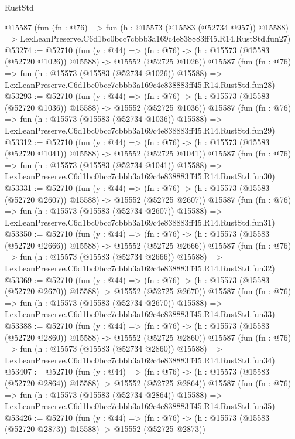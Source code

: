 \begin{lexlean}{RustStd}
\begin{coremodule}
    @15587
    (fun (fn : @76) =>
    fun (h : @15573 (@15583 (@52734 @957)) @15588) =>
    LexLeanPreserve.C6d1bc0bcc7cbbb3a169c4e838883ff45.R14.RustStd.fun27)
@53274 := @52710
    (fun (y : @44) =>
    (fn : @76) -> (h : @15573 (@15583 (@52720 @1026)) @15588) -> @15552 (@52725 @1026))
    @15587
    (fun (fn : @76) =>
    fun (h : @15573 (@15583 (@52734 @1026)) @15588) =>
    LexLeanPreserve.C6d1bc0bcc7cbbb3a169c4e838883ff45.R14.RustStd.fun28)
@53293 := @52710
    (fun (y : @44) =>
    (fn : @76) -> (h : @15573 (@15583 (@52720 @1036)) @15588) -> @15552 (@52725 @1036))
    @15587
    (fun (fn : @76) =>
    fun (h : @15573 (@15583 (@52734 @1036)) @15588) =>
    LexLeanPreserve.C6d1bc0bcc7cbbb3a169c4e838883ff45.R14.RustStd.fun29)
@53312 := @52710
    (fun (y : @44) =>
    (fn : @76) -> (h : @15573 (@15583 (@52720 @1041)) @15588) -> @15552 (@52725 @1041))
    @15587
    (fun (fn : @76) =>
    fun (h : @15573 (@15583 (@52734 @1041)) @15588) =>
    LexLeanPreserve.C6d1bc0bcc7cbbb3a169c4e838883ff45.R14.RustStd.fun30)
@53331 := @52710
    (fun (y : @44) =>
    (fn : @76) -> (h : @15573 (@15583 (@52720 @2607)) @15588) -> @15552 (@52725 @2607))
    @15587
    (fun (fn : @76) =>
    fun (h : @15573 (@15583 (@52734 @2607)) @15588) =>
    LexLeanPreserve.C6d1bc0bcc7cbbb3a169c4e838883ff45.R14.RustStd.fun31)
@53350 := @52710
    (fun (y : @44) =>
    (fn : @76) -> (h : @15573 (@15583 (@52720 @2666)) @15588) -> @15552 (@52725 @2666))
    @15587
    (fun (fn : @76) =>
    fun (h : @15573 (@15583 (@52734 @2666)) @15588) =>
    LexLeanPreserve.C6d1bc0bcc7cbbb3a169c4e838883ff45.R14.RustStd.fun32)
@53369 := @52710
    (fun (y : @44) =>
    (fn : @76) -> (h : @15573 (@15583 (@52720 @2670)) @15588) -> @15552 (@52725 @2670))
    @15587
    (fun (fn : @76) =>
    fun (h : @15573 (@15583 (@52734 @2670)) @15588) =>
    LexLeanPreserve.C6d1bc0bcc7cbbb3a169c4e838883ff45.R14.RustStd.fun33)
@53388 := @52710
    (fun (y : @44) =>
    (fn : @76) -> (h : @15573 (@15583 (@52720 @2860)) @15588) -> @15552 (@52725 @2860))
    @15587
    (fun (fn : @76) =>
    fun (h : @15573 (@15583 (@52734 @2860)) @15588) =>
    LexLeanPreserve.C6d1bc0bcc7cbbb3a169c4e838883ff45.R14.RustStd.fun34)
@53407 := @52710
    (fun (y : @44) =>
    (fn : @76) -> (h : @15573 (@15583 (@52720 @2864)) @15588) -> @15552 (@52725 @2864))
    @15587
    (fun (fn : @76) =>
    fun (h : @15573 (@15583 (@52734 @2864)) @15588) =>
    LexLeanPreserve.C6d1bc0bcc7cbbb3a169c4e838883ff45.R14.RustStd.fun35)
@53426 := @52710
    (fun (y : @44) =>
    (fn : @76) -> (h : @15573 (@15583 (@52720 @2873)) @15588) -> @15552 (@52725 @2873))

\end{coremodule}
\end{lexlean}
